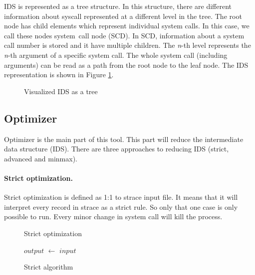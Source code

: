 IDS is represented as a tree structure. In this structure, there are different
information about syscall represented at a different level in the tree. The root
node has child elements which represent individual system calls. In this case,
we call these nodes system~call node (SCD). In SCD, information about a system
call number is stored and it have multiple children. The \textit{n}-th level
represents the \textit{n}-th argument of a specific system call. The whole
system call (including arguments) can be read as a path from the root node to
the leaf node. The IDS representation is shown in Figure \ref{fig:tikz:IDStree}.

\begin{figure}[H]
\centering
  \caption{Visualized IDS as a tree}
  \label{fig:tikz:IDStree}
\end{figure}

\subsection{Optimizer}
Optimizer is the main part of this tool.
This part will reduce the intermediate data structure (IDS).
There are three approaches to reducing IDS (strict, advanced and minmax).

	\paragraph{Strict optimization.}
	Strict optimization is defined as 1:1 to strace input file.
	It means that it will interpret every record in strace as a strict rule.
	So only that one case is only possible to run.
	Every minor change in system call will kill the process.

	\begin{figure}
		\begin{algorithm}[H]


			\caption{Strict optimization}
			$output$ $\leftarrow$ $input$
		\end{algorithm}
		\caption{Strict algorithm}
		\label{alog:strict}
	\end{figure}

